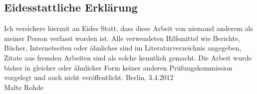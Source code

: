 \subsection*{Eidesstattliche Erklärung}

Ich versichere hiermit an Eides Statt, dass diese Arbeit von niemand anderem als
meiner Person verfasst worden ist. Alle verwendeten Hilfsmittel wie Berichte,
Bücher, Internetseiten oder ähnliches sind im Literaturverzeichnis angegeben,
Zitate aus fremden Arbeiten sind als solche kenntlich gemacht. Die Arbeit wurde
bisher in gleicher oder ähnlicher Form keiner anderen Prüfungskommission
vorgelegt und auch nicht veröffentlicht. \parbig
Berlin, 3.4.2012\\[16ex]
Malte Rohde

\clearpage